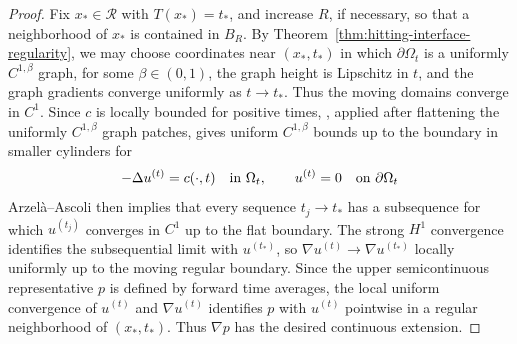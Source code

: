 \documentclass[11pt]{amsart}
\numberwithin{equation}{section}
\numberwithin{figure}{section}
\theoremstyle{plain}
\theoremstyle{definition}
\theoremstyle{remark}
\theoremstyle{plain}
\begin{document}
\begin{proof}
Fix \(x_*\in\mathcal R\) with \(T(x_*)=t_*\), and increase \(R\), if necessary,
so that a neighborhood of \(x_*\) is contained in \(B_R\).  By
Theorem~\ref{thm:hitting-interface-regularity}, we may choose coordinates near
\((x_*,t_*)\) in which \(\partial\Omega_t\) is a uniformly
\(C^{1,\beta}\) graph, for some \(\beta\in(0,1)\), the graph height is
Lipschitz in \(t\), and the graph gradients converge uniformly as
\(t\to t_*\). Thus the moving domains converge in $C^1$.
Since \(c\) is locally bounded for positive times,
\cite[Cor.~8.36]{GilTru}, applied after flattening the uniformly
\(C^{1,\beta}\) graph patches, gives uniform \(C^{1,\beta}\) bounds up to the
boundary in smaller cylinders for
\[
    -\Delta u^{(t)}=c(\cdot,t)\quad\hbox{in }\Omega_t,\qquad u^{(t)}=0\quad\hbox{on }\partial\Omega_t
\]
Arzelà--Ascoli then implies that every sequence \(t_j\to t_*\) has a subsequence
for which \(u^{(t_j)}\) converges in \(C^1\) up to the flat boundary. The strong
\(H^1\) convergence identifies the subsequential limit with \(u^{(t_*)}\), so
\(\nabla u^{(t)}\to\nabla u^{(t_*)}\) locally uniformly up to the moving regular
boundary. Since the upper semicontinuous representative \(p\) is defined by
forward time averages, the local uniform convergence of \(u^{(t)}\) and \(\nabla
u^{(t)}\) identifies \(p\) with \(u^{(t)}\) pointwise in a regular neighborhood of
\((x_*,t_*)\). Thus \(\nabla p\) has the desired continuous extension.
\end{proof}
\end{document}

